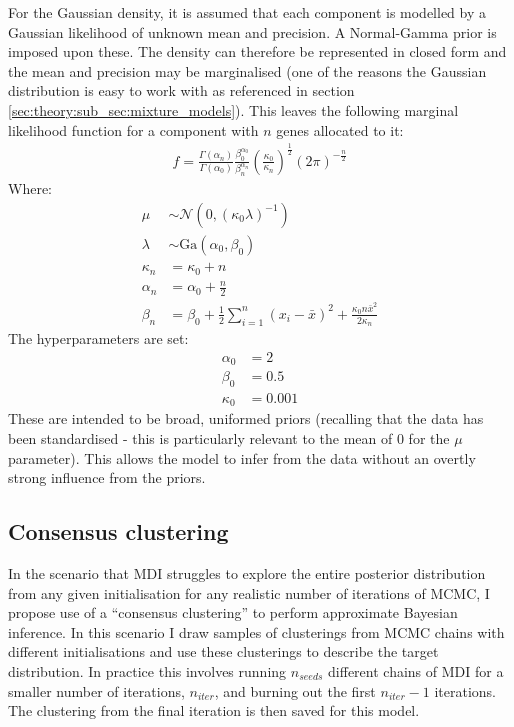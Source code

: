 \documentclass[12pt]{article} %
\begin{document}
	For the Gaussian density, it is assumed that each component is modelled by a Gaussian likelihood of unknown mean and  precision. A Normal-Gamma  prior is imposed upon these. The  density can therefore be represented in closed form and the mean and precision may be marginalised (one of the reasons the Gaussian distribution is easy to work with as referenced in section \ref{sec:theory:sub_sec:mixture_models}). This leaves the following marginal likelihood function for a component with $n$ genes allocated to it:
	\begin{align}
	f = \frac{\Gamma(\alpha_n)}{\Gamma(\alpha_0)} \frac{\beta_0 ^ {\alpha_0}}{\beta_n ^ {\alpha_n}} \left(\frac{\kappa_0}{\kappa_n}\right)^{\frac{1}{2}}\left(2\pi\right)^{-\frac{n}{2}}
	\end{align}
	Where:
	\begin{align}
		\mu &\sim \mathcal{N}(0, (\kappa_0 \lambda)^{-1}) \\
		\lambda &\sim \text{Ga}(\alpha_0, \beta_0) \\
		\kappa_n &= \kappa_0 + n \\
		\alpha_n &= \alpha_0 + \frac{n}{2} \\
		\beta_n &= \beta_0 + \frac{1}{2} \sum_{i=1}^n(x_i - \bar{x})^2 + \frac{\kappa_0 n \bar{x}^2}{2 \kappa_n}
	\end{align}
	The hyperparameters are set:
	\begin{align}
	\alpha_0 &=2 \\
	\beta_0 &= 0.5 \\
	\kappa_0 &= 0.001
	\end{align}
	These are intended to be broad, uniformed priors (recalling that the data has been standardised - this is particularly relevant to the mean of 0 for the $\mu$ parameter). This allows the model to infer from the data without an overtly strong influence from the priors.
		
	\subsection{Consensus clustering} \label{sec:consensus_clustering}
	In the scenario that MDI struggles to explore the entire posterior distribution from any given initialisation for any realistic number of iterations of MCMC, I propose use of a ``consensus clustering'' \cite{MontiConsensusClusteringResamplingBased} to perform approximate Bayesian inference. In this scenario I draw samples of clusterings from MCMC chains with different initialisations and use these clusterings to describe the target distribution. In practice this involves running $n_{seeds}$ different chains of MDI for a smaller number of iterations, $n_{iter}$, and burning out the first $n_{iter} - 1$ iterations. The clustering from the final iteration is then saved for this model.
	
\end{document}

